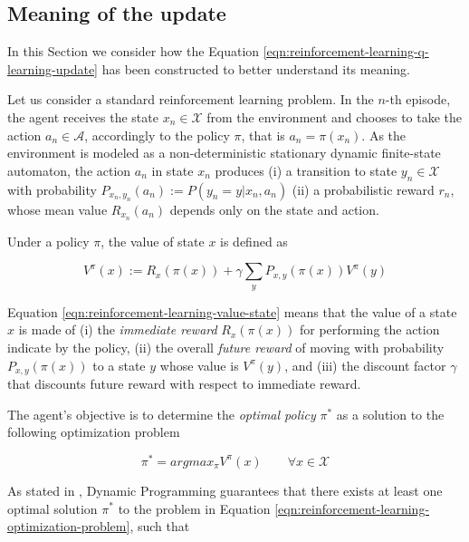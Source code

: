 \subsection{Meaning of the update}
\label{sec:reinforcement-learning-meaning-of-the-update}
In this Section we consider how the Equation \ref{eqn:reinforcement-learning-q-learning-update} has been constructed to better understand its meaning.

Let us consider a standard reinforcement learning problem.
%
In the $n$-th episode, the agent receives the state $x_{n}\in\mathcal{X}$ from the environment and chooses to take the action $a_{n}\in\mathcal{A}$, accordingly to the policy $\pi$, that is $a_{n}=\pi(x_{n})$.
%
As the environment is modeled as a non-deterministic stationary dynamic finite-state automaton, the action $a_{n}$ in state $x_{n}$ produces
(i) a transition to state $y_{n}\in\mathcal{X}$ with probability $P_{x_{n},y_{n}}(a_{n}):=P(y_{n}=y|x_{n},a_{n})$
(ii) a probabilistic reward $r_{n}$, whose mean value $R_{x_{n}}(a_{n})$ depends only on the state and action.

Under a policy $\pi$, the value of state $x$ is defined as

\begin{equation}
\label{eqn:reinforcement-learning-value-state}
V^{\pi}(x) := R_{x}(\pi(x)) + \gamma \sum_{y} P_{x,y}(\pi(x))V^{\pi}(y)
\end{equation}

Equation \ref{eqn:reinforcement-learning-value-state} means that the value of a state $x$ is made of
(i) the \textit{immediate reward} $R_{x}(\pi(x))$ for performing the action indicate by the policy,
(ii) the overall \textit{future reward} of moving with probability $P_{x,y}(\pi(x))$ to a state $y$ whose value is $V^{\pi}(y)$, and 
(iii) the discount factor $\gamma$ that discounts future reward with respect to immediate reward.

The agent's objective is to determine the \textit{optimal policy} $\pi^{*}$ as a solution to the following optimization problem

\begin{equation}
\label{eqn:reinforcement-learning-optimization-problem}
\pi^{*} = argmax_{\pi} V^{\pi}(x)\qquad\forall x\in\mathcal{X}
\end{equation}

As stated in \cite{bellman2015applied,ross2014introduction}, Dynamic Programming guarantees that there exists at least one optimal solution $\pi^{*}$ to the problem in Equation \ref{eqn:reinforcement-learning-optimization-problem}, such that

